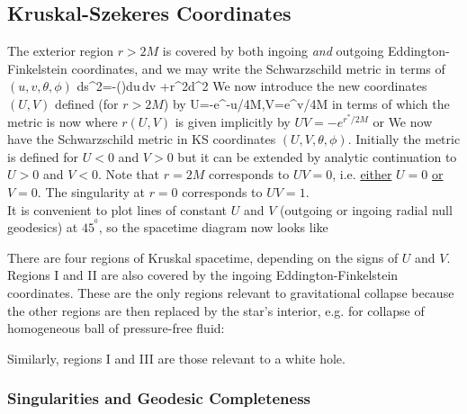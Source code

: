 \subsection{Kruskal-Szekeres Coordinates}

The exterior region $r>2M$ is covered by both ingoing \emph{and} outgoing 
Eddington-Finkelstein coordinates, and we may write the Schwarzschild metric in
terms of $(u,v,\theta,\phi)$
\be
ds^2=-\left(\Schr\right)du\,dv +r^2d\Omega^2 
\ee
We now introduce the new coordinates $(U,V)$ defined (for $r>2M$) by
\be
U=-e^{-u/4M},\quad V=e^{v/4M}
\ee
in terms of which the metric is now 
where $r(U,V)$ is given implicitly by $UV=-e^{r^*/2M}$ or
We now have the Schwarzschild metric in KS coordinates $(U,V,\theta,\phi)$.  
Initially the metric is defined for $U<0$ and $V>0$ but it can be extended by
analytic continuation to $U>0$ and $V<0$.  Note that $r=2M$  corresponds to
$UV=0$, i.e. \ul{either} $U=0$ \ul{or} $V=0$.  The singularity at $r=0$
corresponds to $UV=1$. \\

It is convenient to plot lines of constant $U$ and $V$ (outgoing or ingoing
radial null geodesics) at $45^{^0}$, so the spacetime diagram now looks like 
\begin{center}\end{center}
There are four regions of Kruskal spacetime, depending on the signs of $U$ and 
$V$.  Regions I and II are also covered by the ingoing Eddington-Finkelstein
coordinates.  These are the only regions relevant to gravitational collapse
because the other regions are then replaced by the star's interior, e.g. for
collapse of homogeneous ball of pressure-free fluid: 
\begin{center}\end{center}
Similarly, regions I and III are those relevant to a white hole.

\subsubsection{Singularities and Geodesic Completeness}

